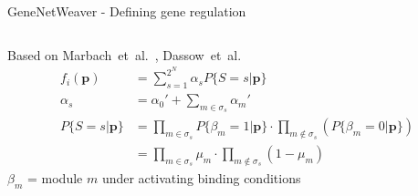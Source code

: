 \begin{frame}{GeneNetWeaver - Defining gene regulation}
\begin{columns}
\begin{column}{0.5\textwidth}
\small
Based on Marbach~et~al.~\cite{Marbach2010}, Dassow~et~al.~\cite{GeneNetWeaverModel}
\normalsize
\begin{subequations}
\label{eq:gnw_f}
\begin{align}
\label{eq:gnw_f.a}
f_i(\boldsymbol{p}) &=
\sum_{s=1}^{2^N} \alpha_s P\{S = s | \boldsymbol{p} \}
\\
\label{eq:gnw_f.b}
\alpha_s &=
\alpha_0' + \sum_{m \in \sigma_s} \alpha_m'
\\
\label{eq:gnw_f.c}
P\{S = s | \boldsymbol{p} \} &=
\prod_{m \in \sigma_s} P\{\beta_m=1|\boldsymbol{p}\} \cdot \prod_{m \notin \sigma_s} \left( P\{\beta_m=0|\boldsymbol{p}\} \right)
\\
\label{eq:gnw_f.d}
&=
\prod_{m \in \sigma_s} \mu_m \cdot \prod_{m \notin \sigma_s} \left( 1 - \mu_m \right)
\end{align}
\end{subequations}
$\beta_m$ = module $m$ under activating binding conditions
\end{column}


\end{columns}
\end{frame}
